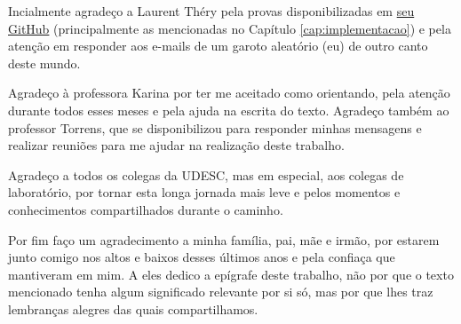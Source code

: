 \begin{agradecimentos}
	Incialmente agradeço a Laurent Théry pela provas disponibilizadas em \hyperlink{https://github.com/thery/mathcomp-extra/blob/master/euler.v}{seu GitHub} (principalmente as mencionadas no Capítulo \ref{cap:implementacao}) e pela atenção em responder aos e-mails de um garoto aleatório (eu) de outro canto deste mundo.

	Agradeço à professora Karina por ter me aceitado como orientando, pela atenção durante todos esses meses e pela ajuda na escrita do texto. Agradeço também ao professor Torrens, que se disponibilizou para responder minhas mensagens e realizar reuniões para me ajudar na realização deste trabalho.

	Agradeço a todos os colegas da UDESC, mas em especial, aos colegas de laboratório, por tornar esta longa jornada mais leve e pelos momentos e conhecimentos compartilhados durante o caminho.

	Por fim faço um agradecimento a minha família, pai, mãe e irmão, por estarem junto comigo nos altos e baixos desses últimos anos e pela confiaça que mantiveram em mim. A eles dedico a epígrafe deste trabalho, não por que o texto mencionado tenha algum significado relevante por si só, mas por que lhes traz lembranças alegres das quais compartilhamos.
\end{agradecimentos}


